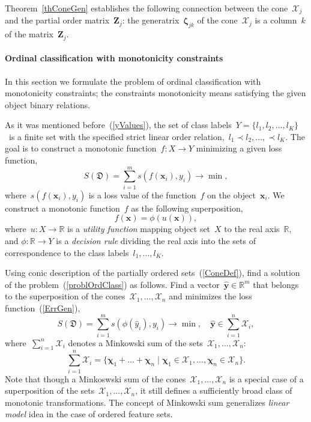 \documentclass[12pt,preprint]{elsarticle}
\newcommand{\bx}{\mathbf{x}}
\newcommand{\by}{\mathbf{y}}
\newcommand{\bZ}{\mathbf{Z}}
\newcommand{\bchi}{\boldsymbol{\chi}}
\newcommand{\bzeta}{\boldsymbol{\zeta}}
\begin{document}
Theorem~\ref{thConeGen} establishes the following connection between the cone~$\mathcal{X}_j$ and the partial order matrix~$\bZ_j$: the generatrix~$\bzeta_{jk}$ of the cone~$\mathcal{X}_j$ is a column~$k$ of the matrix~$\bZ_j$.

\paragraph{Ordinal classification with monotonicity constraints}
In this section we formulate the problem of ordinal classification with monotonicity constraints; the constraints monotonicity means satisfying the given object binary relations.

As it was mentioned before~(\ref{yValues}), the set of class labels~$Y=\{l_1,l_2,...,l_K\}$~is a finite set with the specified strict linear order relation,~$l_1\prec l_2,...,\prec l_K$. The goal is to construct a monotonic function~$f:X\rightarrow Y$ minimizing a given loss function,
\begin{equation}
S(\mathfrak{D})=\sum\limits_{i=1}^m{s(f(\bx_i), y_i)}\rightarrow \min,
\label{ErrGen}
\end{equation}
where~$s(f(\bx_i), y_i)$ is a loss value of the function~$f$ on the object~$\bx_i$.
We construct a monotonic function~$f$ as the following superposition,
\begin{equation}
f(\bx)=\phi(u(\bx)),
\label{problOrdClass}
\end{equation}
where~$u:X\rightarrow \mathbb{R}$ is a \emph{utility function} mapping object set~$X$ to the real axis~$\mathbb{R}$, and $\phi:\mathbb{R}\rightarrow Y$ is a \emph{decision rule} dividing the real axis into the sets of correspondence to the class labels~$l_1,...,l_K$.

Using conic description of the partially ordered sets~(\ref{ConeDef}), find a solution of the problem~(\ref{problOrdClass}) as follows. Find a vector~$\hat{\by}\in \mathbb{R}^m$ that belongs to the superposition of the cones~$\mathcal{X}_1,...,\mathcal{X}_n$ and minimizes the loss function~(\ref{ErrGen}),
\[
S(\mathfrak{D})=\sum\limits_{i=1}^m{s(\phi(\hat{y}_i), y_i)}\rightarrow \min,\quad \hat{\by}\in \sum\limits_{i=1}^n\mathcal{X}_i,
\]
where~$\sum\limits_{i=1}^n\mathcal{X}_i$ denotes a Minkowski sum of the sets~$\mathcal{X}_1,...,\mathcal{X}_n$:
\[
\sum\limits_{i=1}^n\mathcal{X}_i=\{\bchi_1+...+\bchi_n\;|\;\bchi_1\in\mathcal{X}_1,...,\bchi_n\in\mathcal{X}_n\}.
\]
Note that though a Minkoswski sum of the cones~$\mathcal{X}_1,...,\mathcal{X}_n$ is a special case of a superposition of the sets~$\mathcal{X}_1,...,\mathcal{X}_n$, it still defines a sufficiently broad class of monotonic transformations. The concept of Minkowski sum generalizes \emph{linear model} idea in the case of ordered feature sets.
\end{document}
